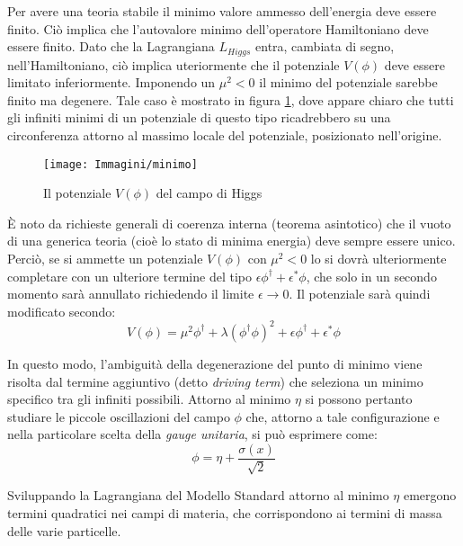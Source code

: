 Per avere una teoria stabile il minimo valore ammesso dell'energia deve essere finito. Ciò implica che l'autovalore minimo dell'operatore
Hamiltoniano deve essere finito.
Dato che la Lagrangiana $L_{Higgs}$ entra, cambiata di segno, nell'Hamiltoniano, ciò implica uteriormente che il potenziale $V(\phi)$ deve essere limitato
inferiormente.
Imponendo un $\mu^{2}<0$ il minimo del potenziale sarebbe finito ma degenere.
Tale caso è mostrato in figura \ref{minimo}, dove appare chiaro che tutti gli infiniti minimi di un potenziale di questo tipo ricadrebbero su una
circonferenza attorno al massimo locale del potenziale, posizionato nell'origine.
\begin{figure}[!htbp]
\begin{center}
\texttt{[image: Immagini/minimo]}
\end{center}
\caption{Il potenziale $V(\phi)$ del campo di Higgs}
\label{minimo}
\end{figure}

\`{E} noto da richieste generali di coerenza interna (teorema asintotico) che il vuoto di una generica teoria (cioè lo stato di minima energia)
deve sempre essere unico. Perciò, se si ammette un potenziale $V(\phi)$ con $\mu^{2}<0$ lo si dovrà ulteriormente completare con un ulteriore
termine del tipo $\epsilon\phi^{\dagger}+\epsilon^{*}\phi$, che solo in un secondo momento sarà annullato richiedendo il limite 
$\epsilon\rightarrow0$.
\newline
Il potenziale sarà quindi modificato secondo:
\begin{equation}
  V(\phi)=\mu^{2}\phi^{\dagger}+\lambda(\phi^{\dagger}\phi)^{2}+\epsilon\phi^{\dagger}+\epsilon^{*}\phi
\end{equation}

In questo modo, l'ambiguità della degenerazione del punto di minimo viene risolta dal termine aggiuntivo (detto \textit{driving term}) che
seleziona un minimo specifico tra gli infiniti possibili.
Attorno al minimo $\eta$ si possono pertanto studiare le piccole oscillazioni del campo $\phi$ che, attorno a tale configurazione
e nella particolare scelta della \textit{gauge unitaria},
si può esprimere come:
\begin{equation}
 \phi=\eta+\dfrac{\sigma(x)}{\sqrt{2}}
\end{equation}

Sviluppando la Lagrangiana del Modello Standard attorno al minimo $\eta$ emergono termini quadratici nei campi di materia, che corrispondono ai termini di massa
delle varie particelle.

